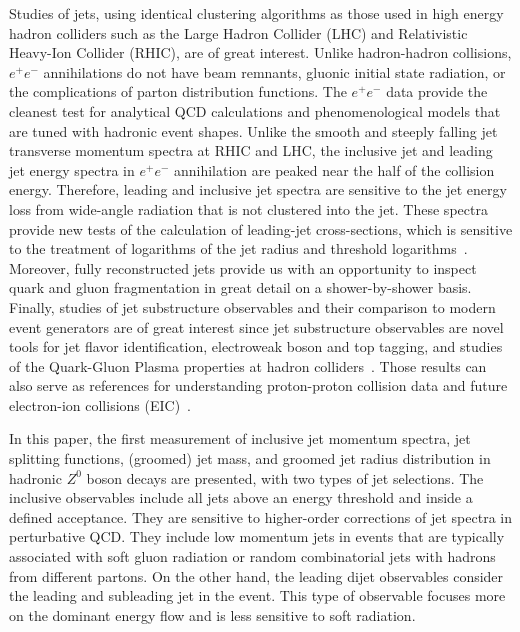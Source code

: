\documentclass[aps,preprint,superscriptaddress,groupedaddress]{revtex4}  %
\begin{document}
Studies of jets, using identical clustering algorithms as those used in high energy hadron colliders such as the Large Hadron Collider (LHC) and Relativistic Heavy-Ion Collider (RHIC), are of great interest.
Unlike hadron-hadron collisions, $e^+e^-$ annihilations do not have beam remnants, gluonic initial state radiation, or the complications of parton distribution functions. The $e^+e^-$ data provide the cleanest test for analytical QCD calculations and phenomenological models that are tuned with hadronic event shapes. Unlike the smooth and steeply falling jet transverse momentum spectra at RHIC and LHC, the inclusive jet and leading jet energy spectra in $e^+e^-$ annihilation are peaked near the half of the collision energy.
Therefore, leading and inclusive jet spectra are sensitive to the jet energy loss from wide-angle radiation that is not clustered into the jet. These spectra provide new tests of the calculation of leading-jet cross-sections, which is sensitive to the treatment of logarithms of the jet radius and threshold logarithms~\cite{Neill:2021std}. Moreover, fully reconstructed jets provide us with an opportunity to inspect quark and gluon fragmentation in great detail on a shower-by-shower basis.
Finally, studies of jet substructure observables and their comparison to modern event generators are of great interest since jet substructure observables are novel tools for jet flavor identification, electroweak boson and top tagging, and studies of the Quark-Gluon Plasma properties at hadron colliders~\cite{Andrews:2018jcm}. Those results can also serve as references for understanding proton-proton collision data and future electron-ion collisions (EIC)~\cite{AbdulKhalek:2021gbh}. 

In this paper, the first measurement of inclusive jet momentum spectra, jet splitting functions, (groomed) jet mass, and groomed jet radius distribution in hadronic $Z^0$ boson decays are presented, with two types of jet selections. The inclusive observables include all jets above an energy threshold and inside a defined acceptance. They are sensitive to higher-order corrections of jet spectra in perturbative QCD. They include low momentum jets in events that are typically associated with soft gluon radiation or random combinatorial jets with hadrons from different partons. On the other hand, the leading dijet observables consider the leading and subleading jet in the event. This type of observable focuses more on the dominant energy flow and is less sensitive to soft radiation.
\end{document}
